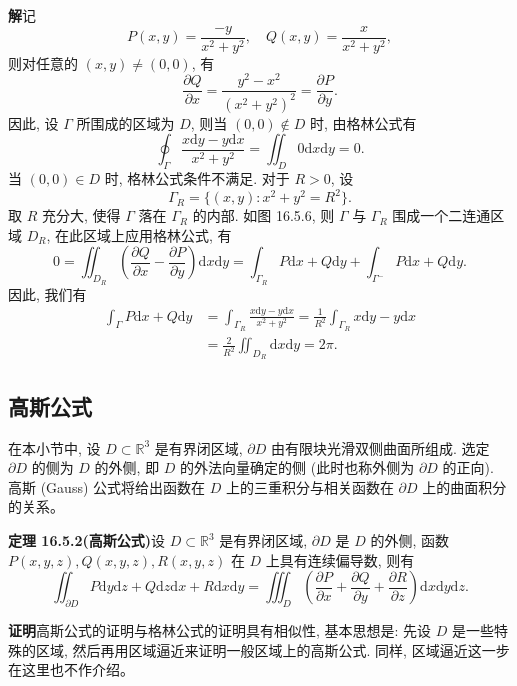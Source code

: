 \documentclass[UTF8, 12pt, fontset=fandol, oneside]{ctexart}
\begin{document}
\noindent\textbf{解}\quad 记
\[
  P(x,y)=\frac{-y}{x^2+y^2},\quad Q(x,y)=\frac{x}{x^2+y^2},
\]
则对任意的 $(x,y)\ne(0,0)$, 有
\[
  \frac{\partial Q}{\partial x}=\frac{y^2-x^2}{(x^2+y^2)^2}=\frac{\partial P}{\partial y}.
\]
因此, 设 $\Gamma$ 所围成的区域为 $D$, 则当 $(0,0)\notin D$ 时, 由格林公式有
\[
  \oint_\Gamma\frac{x\mathrm dy-y\mathrm dx}{x^2+y^2}
  =\iint_D0\mathrm dx\mathrm dy=0.
\]
当 $(0,0)\in D$ 时, 格林公式条件不满足. 对于 $R>0$, 设
\[
  \Gamma_R=\{(x,y):x^2+y^2=R^2\}.
\]
取 $R$ 充分大, 使得 $\Gamma$ 落在 $\Gamma_R$ 的内部. 如图 16.5.6, 则 $\Gamma$ 与 $\Gamma_R$ 围成一个二连通区域 $D_R$, 在此区域上应用格林公式, 有
\[
  0=\iint_{D_R}\left(\frac{\partial Q}{\partial x}-\frac{\partial P}{\partial y}\right)\mathrm dx\mathrm dy
  =\int_{\Gamma_R}P\mathrm dx+Q\mathrm dy+\int_{\Gamma^-}P\mathrm dx+Q\mathrm dy.
\]
因此, 我们有
\[
\begin{aligned}
  \int_\Gamma P\mathrm dx+Q\mathrm dy
  &=\int_{\Gamma_R}\frac{x\mathrm dy-y\mathrm dx}{x^2+y^2}
    =\frac1{R^2}\int_{\Gamma_R}x\mathrm dy-y\mathrm dx\\
  &=\frac2{R^2}\iint_{D_R}\mathrm dx\mathrm dy=2\pi.
\end{aligned}
\]

\subsection{高斯公式}

在本小节中, 设 $D\subset\mathbb R^3$ 是有界闭区域, $\partial D$ 由有限块光滑双侧曲面所组成. 选定 $\partial D$ 的侧为 $D$ 的外侧, 即 $D$ 的外法向量确定的侧 (此时也称外侧为 $\partial D$ 的正向). 高斯 (Gauss) 公式将给出函数在 $D$ 上的三重积分与相关函数在 $\partial D$ 上的曲面积分的关系。

\noindent\textbf{定理 16.5.2(高斯公式)}\quad 设 $D\subset\mathbb R^3$ 是有界闭区域, $\partial D$ 是 $D$ 的外侧, 函数\allowbreak $P(x,y,z),Q(x,y,z),R(x,y,z)$ 在 $D$ 上具有连续偏导数, 则有
\[
  \iint_{\partial D}P\mathrm dy\mathrm dz+Q\mathrm dz\mathrm dx+R\mathrm dx\mathrm dy
  =\iiint_D\left(\frac{\partial P}{\partial x}+\frac{\partial Q}{\partial y}
  +\frac{\partial R}{\partial z}\right)\mathrm dx\mathrm dy\mathrm dz.
\]

\noindent\textbf{证明}\quad 高斯公式的证明与格林公式的证明具有相似性, 基本思想是: 先设 $D$ 是一些特殊的区域, 然后再用区域逼近来证明一般区域上的高斯公式. 同样, 区域逼近这一步在这里也不作介绍。
\end{document}
